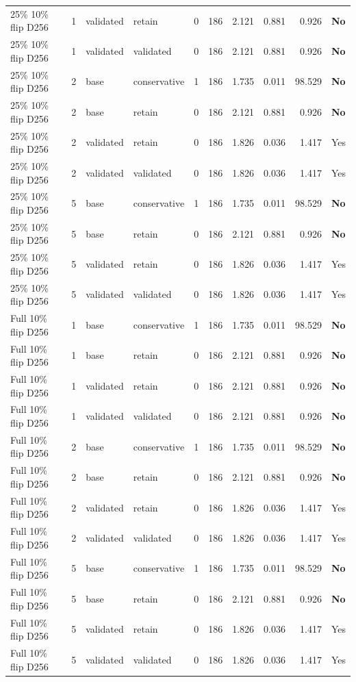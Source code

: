 {\begin{longtable}{llllrrrrrl}
25\% 10\% flip D256 & 1 & validated & retain & 0 & 186 & 2.121 & 0.881 & 0.926 & \textbf{No}\\
25\% 10\% flip D256 & 1 & validated & validated & 0 & 186 & 2.121 & 0.881 & 0.926 & \textbf{No}\\
25\% 10\% flip D256 & 2 & base & conservative & 1 & 186 & 1.735 & 0.011 & 98.529 & \textbf{No}\\
25\% 10\% flip D256 & 2 & base & retain & 0 & 186 & 2.121 & 0.881 & 0.926 & \textbf{No}\\
25\% 10\% flip D256 & 2 & validated & retain & 0 & 186 & 1.826 & 0.036 & 1.417 & Yes\\
25\% 10\% flip D256 & 2 & validated & validated & 0 & 186 & 1.826 & 0.036 & 1.417 & Yes\\
25\% 10\% flip D256 & 5 & base & conservative & 1 & 186 & 1.735 & 0.011 & 98.529 & \textbf{No}\\
25\% 10\% flip D256 & 5 & base & retain & 0 & 186 & 2.121 & 0.881 & 0.926 & \textbf{No}\\
25\% 10\% flip D256 & 5 & validated & retain & 0 & 186 & 1.826 & 0.036 & 1.417 & Yes\\
25\% 10\% flip D256 & 5 & validated & validated & 0 & 186 & 1.826 & 0.036 & 1.417 & Yes\\
Full 10\% flip D256 & 1 & base & conservative & 1 & 186 & 1.735 & 0.011 & 98.529 & \textbf{No}\\
Full 10\% flip D256 & 1 & base & retain & 0 & 186 & 2.121 & 0.881 & 0.926 & \textbf{No}\\
Full 10\% flip D256 & 1 & validated & retain & 0 & 186 & 2.121 & 0.881 & 0.926 & \textbf{No}\\
Full 10\% flip D256 & 1 & validated & validated & 0 & 186 & 2.121 & 0.881 & 0.926 & \textbf{No}\\
Full 10\% flip D256 & 2 & base & conservative & 1 & 186 & 1.735 & 0.011 & 98.529 & \textbf{No}\\
Full 10\% flip D256 & 2 & base & retain & 0 & 186 & 2.121 & 0.881 & 0.926 & \textbf{No}\\
Full 10\% flip D256 & 2 & validated & retain & 0 & 186 & 1.826 & 0.036 & 1.417 & Yes\\
Full 10\% flip D256 & 2 & validated & validated & 0 & 186 & 1.826 & 0.036 & 1.417 & Yes\\
Full 10\% flip D256 & 5 & base & conservative & 1 & 186 & 1.735 & 0.011 & 98.529 & \textbf{No}\\
Full 10\% flip D256 & 5 & base & retain & 0 & 186 & 2.121 & 0.881 & 0.926 & \textbf{No}\\
Full 10\% flip D256 & 5 & validated & retain & 0 & 186 & 1.826 & 0.036 & 1.417 & Yes\\
Full 10\% flip D256 & 5 & validated & validated & 0 & 186 & 1.826 & 0.036 & 1.417 & Yes\\
\end{longtable}}
\par\medskip

